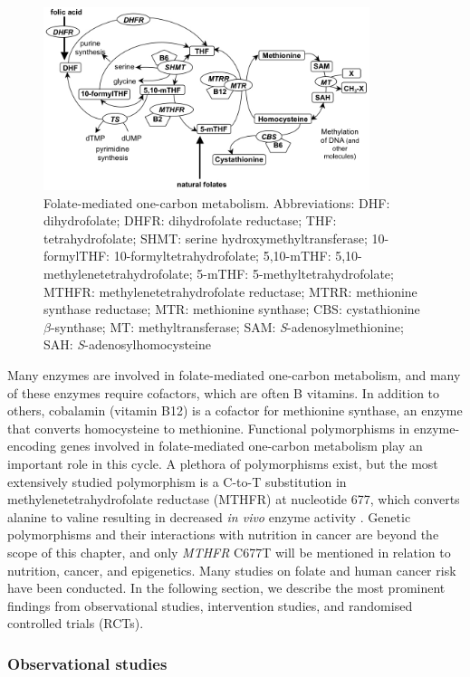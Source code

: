 \begin{figure} [h]
\centering 
\includegraphics[width=0.85\textwidth]{ocm_xls5.jpg} 
\caption{Folate-mediated one-carbon metabolism. Abbreviations: DHF: dihydrofolate; DHFR: dihydrofolate reductase; THF: tetrahydrofolate; SHMT: serine hydroxymethyltransferase; 10-formylTHF: 10-formyltetrahydrofolate; 5,10-mTHF: 5,10-methylenetetrahydrofolate; 5-mTHF: 5-methyltetrahydrofolate; MTHFR: methylenetetrahydrofolate reductase; MTRR: methionine synthase reductase; MTR: methionine synthase; CBS: cystathionine $\beta$-synthase; MT: methyltransferase; SAM: \emph{S}-adenosylmethionine; SAH: \emph{S}-adenosylhomocysteine} 
\label{figure2_2} 
\end{figure}

\noindent Many enzymes are involved in folate-mediated one-carbon metabolism, and many of these enzymes require cofactors, which are often B vitamins. In addition to others, cobalamin (vitamin B12) is a cofactor for methionine synthase, an enzyme that converts homocysteine to methionine. Functional polymorphisms in enzyme-encoding genes involved in folate-mediated one-carbon metabolism play an important role in this cycle. A plethora of polymorphisms exist, but the most extensively studied polymorphism is a C-to-T substitution in methylenetetrahydrofolate reductase (MTHFR) at nucleotide 677, which converts alanine to valine resulting in decreased \emph{in vivo} enzyme activity \cite{c228}. Genetic polymorphisms and their interactions with nutrition in cancer are beyond the scope of this chapter, and only \emph{MTHFR} C677T will be mentioned in relation to nutrition, cancer, and epigenetics. Many studies on folate and human cancer risk have been conducted. In the following section, we describe the most prominent findings from observational studies, intervention studies, and randomised controlled trials (RCTs).

\subsubsection{Observational studies} %
